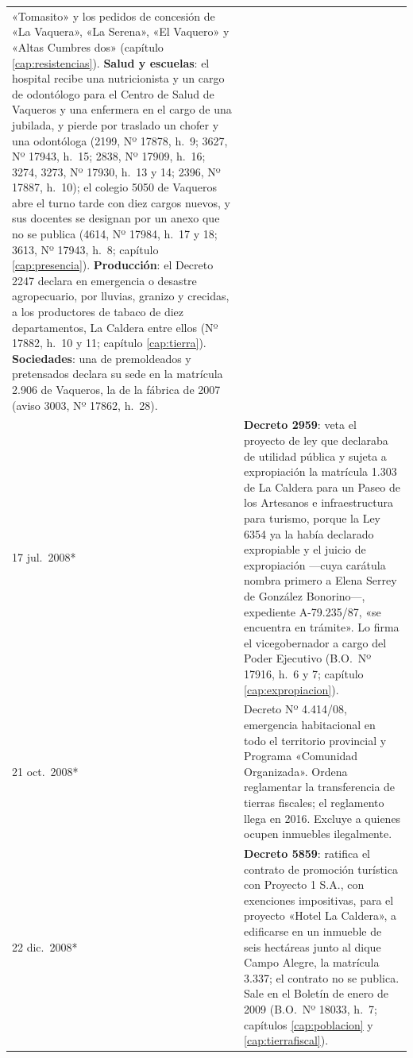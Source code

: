\begin{longtable}{@{}p{2.7cm}p{10.3cm}@{}}
«Tomasito» y los pedidos de concesión de «La Vaquera», «La Serena», «El Vaquero» y «Altas Cumbres dos» (capítulo \ref{cap:resistencias}). \textbf{Salud y escuelas}: el hospital recibe una nutricionista y un cargo de odontólogo para el Centro de Salud de Vaqueros y una enfermera en el cargo de una jubilada, y pierde por traslado un chofer y una odontóloga (2199, Nº 17878, h.\ 9; 3627, Nº 17943, h.\ 15; 2838, Nº 17909, h.\ 16; 3274, 3273, Nº 17930, h.\ 13 y 14; 2396, Nº 17887, h.\ 10); el colegio 5050 de Vaqueros abre el turno tarde con diez cargos nuevos, y sus docentes se designan por un anexo que no se publica (4614, Nº 17984, h.\ 17 y 18; 3613, Nº 17943, h.\ 8; capítulo \ref{cap:presencia}). \textbf{Producción}: el Decreto 2247 declara en emergencia o desastre agropecuario, por lluvias, granizo y crecidas, a los productores de tabaco de diez departamentos, La Caldera entre ellos (Nº 17882, h.\ 10 y 11; capítulo \ref{cap:tierra}). \textbf{Sociedades}: una de premoldeados y pretensados declara su sede en la matrícula 2.906 de Vaqueros, la de la fábrica de 2007 (aviso 3003, Nº 17862, h.\ 28). \\
17 jul.\ 2008* & \textbf{Decreto 2959}: veta el proyecto de ley que declaraba de utilidad pública y sujeta a expropiación la matrícula 1.303 de La Caldera para un Paseo de los Artesanos e infraestructura para turismo, porque la Ley 6354 ya la había declarado expropiable y el juicio de expropiación ---cuya carátula nombra primero a Elena Serrey de González Bonorino---, expediente A-79.235/87, «se encuentra en trámite». Lo firma el vicegobernador a cargo del Poder Ejecutivo (B.O.\ Nº 17916, h.\ 6 y 7; capítulo \ref{cap:expropiacion}). \\
21 oct.\ 2008* & Decreto Nº 4.414/08, emergencia habitacional en todo el territorio provincial y Programa «Comunidad Organizada». Ordena reglamentar la transferencia de tierras fiscales; el reglamento llega en 2016. Excluye a quienes ocupen inmuebles ilegalmente. \\
22 dic.\ 2008* & \textbf{Decreto 5859}: ratifica el contrato de promoción turística con Proyecto 1 S.A., con exenciones impositivas, para el proyecto «Hotel La Caldera», a edificarse en un inmueble de seis hectáreas junto al dique Campo Alegre, la matrícula 3.337; el contrato no se publica. Sale en el Boletín de enero de 2009 (B.O.\ Nº 18033, h.\ 7; capítulos \ref{cap:poblacion} y \ref{cap:tierrafiscal}). \\

\end{longtable}
